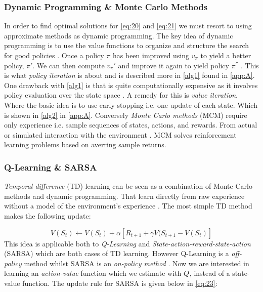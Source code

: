 \documentclass{kththesis}
\theoremstyle{definition}
\begin{document}
\subsubsection*{Dynamic Programming \& Monte Carlo Methods}
In order to find optimal solutions for \autoref{eq:20} and \autoref{eq:21} we must resort to using approximate methods as dynamic programming. The key idea of dynamic programming is to use the value functions to organize and structure the search for good policies \parencite{sutton1998reinforcement, szepesvari2009algorithms}. Once a policy $\pi$ has been improved using $v_{\pi}$ to yield a better policy,  $\pi'$. We can then compute $v_{\pi}'$ and improve it again to yield policy $\pi^{''}$ \parencite{sutton1998reinforcement}. This is what \textit{policy iteration} is about and is described more in \autoref{alg1} found in \autoref{app:A}.
\newline
\newline
One drawback with \autoref{alg1} is that is quite computationally expensive as it involves policy evaluation over the state space \parencite{sutton1998reinforcement}. A remedy for this is \textit{value iteration}. Where the basic idea is to use early stopping i.e. one update of each state. Which is shown in \autoref{alg2} in \autoref{app:A}. Conversely \textit{Monte Carlo methods} (MCM) require only experience i.e. sample sequences of states, actions, and rewards. From actual or simulated interaction with the environment \parencite{sutton1998reinforcement}. MCM solves reinforcement learning problems based on averring sample returns. 


\subsubsection*{Q-Learning \& SARSA}
\textit{Temporal difference} (TD) learning can be seen as a combination of Monte Carlo methods and dynamic programming. That learn directly from raw experience without a model of the environment's experience \parencite{sutton1998reinforcement, arulkumaran2017brief}. The most simple TD method makes the following update:

\begin{equation}
    \label{eq:22}
    V(S_t) \leftarrow V(S_t) + \alpha \left[R_{t+1} + \gamma V(S_{t+1} - V(S_t) \right]
\end{equation}
This idea is applicable both to \textit{Q-Learning} and \textit{State-action-reward-state-action} (SARSA) which are both cases of TD learning. However Q-Learning is a \textit{off-policy} method whilst SARSA is an \textit{on-policy method} \parencite{sutton1998reinforcement, arulkumaran2017brief}. Now we are interested in learning an \textit{action-value} function which we estimate with $Q^{}$, instead of a state-value function. The update rule for SARSA is given below in \autoref{eq:23}:
\end{document}
